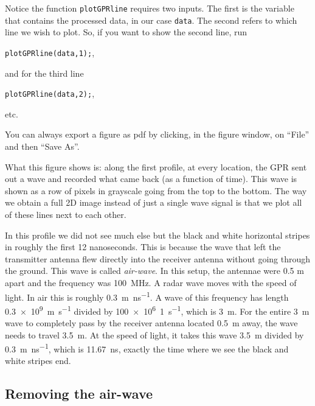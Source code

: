\documentclass[11pt]{article}
\begin{document}
Notice the function \verb#plotGPRline# requires two inputs. The first
is the variable that contains the processed data, in our case \verb#data#.
The second refers to which line we wish to plot. So, if you want to show the second line, run

\qquad \verb#plotGPRline(data,1);#,

and for the third line

\qquad \verb#plotGPRline(data,2);#,

etc.
 
You can always export a figure as pdf by clicking, in the figure
window, on ``File'' and then ``Save As''.

What this figure shows is: along the first profile, at every location,
the GPR sent out a wave and recorded what came back (as a function of
time). This wave is shown as a row of pixels in grayscale going from
the top to the bottom. The way we obtain a full 2D image instead of
just a single wave signal is that we plot all of these lines next to
each other.

In this profile we did not see much else but the black and white
horizontal stripes in roughly the first 12 nanoseconds. This is
because the wave that left the transmitter antenna flew directly into
the receiver antenna without going through the ground. This wave is
called \emph{air-wave}. In this setup, the antennae were 0.5 m apart
and the frequency was \SI{100}{MHz}. A radar wave moves with the speed
of light. In air this is roughly \SI{0.3}{m\per\nano\second}. A wave
of this frequency has length \SI{0.3e9}{m\per\second} divided by
\SI{100e6}{1\per\second}, which is \SI{3}{m}. For the entire \SI{3}{m}
wave to completely pass by the receiver antenna located \SI{0.5}{m}
away, the wave needs to travel \SI{3.5}{m}. At the speed of light, it
takes this wave \SI{3.5}{m} divided by \SI{0.3}{m\per\nano\second},
which is \SI{11.67}{\nano\second}, exactly the time where we see the
black and white stripes end.

\subsection{Removing the air-wave}
\end{document}
